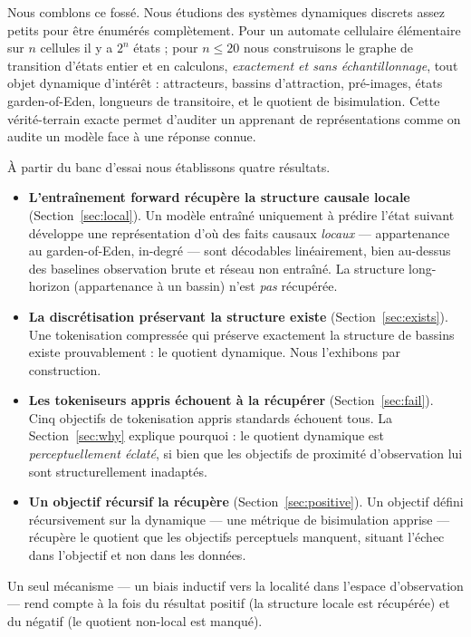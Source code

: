 \documentclass[11pt]{article}
\begin{document}
Nous comblons ce fossé. Nous étudions des systèmes dynamiques discrets assez
petits pour être énumérés complètement. Pour un automate cellulaire élémentaire
sur $n$ cellules il y a $2^n$ états ; pour $n \le 20$ nous construisons le
graphe de transition d'états entier et en calculons, \emph{exactement et sans
échantillonnage}, tout objet dynamique d'intérêt : attracteurs, bassins
d'attraction, pré-images, états garden-of-Eden, longueurs de transitoire, et le
quotient de bisimulation. Cette vérité-terrain exacte permet d'auditer un
apprenant de représentations comme on audite un modèle face à une réponse
connue.

À partir du banc d'essai nous établissons quatre résultats.

\begin{itemize}
  \item \textbf{L'entraînement forward récupère la structure causale locale}
    (Section~\ref{sec:local}). Un modèle entraîné uniquement à prédire l'état
    suivant développe une représentation d'où des faits causaux \emph{locaux}
    --- appartenance au garden-of-Eden, in-degré --- sont décodables
    linéairement, bien au-dessus des baselines observation brute et réseau non
    entraîné. La structure long-horizon (appartenance à un bassin) n'est
    \emph{pas} récupérée.
  \item \textbf{La discrétisation préservant la structure existe}
    (Section~\ref{sec:exists}). Une tokenisation compressée qui préserve
    exactement la structure de bassins existe prouvablement : le quotient
    dynamique. Nous l'exhibons par construction.
  \item \textbf{Les tokeniseurs appris échouent à la récupérer}
    (Section~\ref{sec:fail}). Cinq objectifs de tokenisation appris standards
    échouent tous. La Section~\ref{sec:why} explique pourquoi : le quotient
    dynamique est \emph{perceptuellement éclaté}, si bien que les objectifs de
    proximité d'observation lui sont structurellement inadaptés.
  \item \textbf{Un objectif récursif la récupère}
    (Section~\ref{sec:positive}). Un objectif défini récursivement sur la
    dynamique --- une métrique de bisimulation apprise --- récupère le quotient
    que les objectifs perceptuels manquent, situant l'échec dans l'objectif et
    non dans les données.
\end{itemize}

Un seul mécanisme --- un biais inductif vers la localité dans l'espace
d'observation --- rend compte à la fois du résultat positif (la structure
locale est récupérée) et du négatif (le quotient non-local est manqué).
\end{document}

